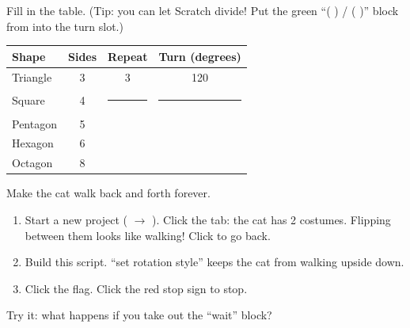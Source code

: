 Fill in the table. (Tip: you can let Scratch divide! Put the green \enquote{( ) / ( )} block from  into the turn slot.)

\begin{center}
\renewcommand{\arraystretch}{1.4}
\begin{tabular}{|l|c|c|c|}
\hline
\textbf{Shape} & \textbf{Sides} & \textbf{Repeat} & \textbf{Turn (degrees)} \\ \hline
Triangle & 3 & 3 & 120 \\ \hline
Square & 4 & \rule{1cm}{0pt} & \rule{1.5cm}{0pt} \\ \hline
Pentagon & 5 & & \\ \hline
Hexagon & 6 & & \\ \hline
Octagon & 8 & & \\ \hline
\end{tabular}
\end{center}

\begin{exercise}
Make the cat walk back and forth forever.
\begin{enumerate}[leftmargin=1.4em,itemsep=1pt]
  \item Start a new project ( $\rightarrow$ ). Click the  tab: the cat has 2 costumes. Flipping between them looks like walking! Click  to go back.
  \item Build this script. \enquote{set rotation style} keeps the cat from walking upside down.
  \item Click the flag. Click the red stop sign to stop.
\end{enumerate}
\begin{center}
\begin{scratch}[scale=0.85]
\end{scratch}
\end{center}
Try it: what happens if you take out the \enquote{wait} block? 
\end{exercise}

